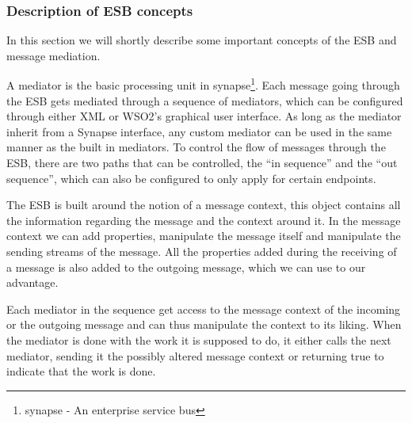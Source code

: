     \subsubsection{Description of ESB concepts}\label{Description of ESB concepts} 

    In this section we will shortly describe some important concepts of the ESB and message mediation.

    A mediator is the basic processing unit in \gls{synapse}\footnote{\gls{synapse} - An enterprise service bus}. Each message going through the ESB gets mediated through a sequence of mediators, which can be configured through either XML or WSO2’s graphical user interface. As long as the mediator inherit from a Synapse interface, any custom mediator can be used in the same manner as the built in mediators. To control the flow of messages through the ESB, there are two paths that can be controlled, the “in sequence” and the “out sequence”, which can also be configured to only apply for certain endpoints.

    The ESB is built around the notion of a message context, this object contains all the information regarding the message and the context around it. In the message context we can add properties, manipulate the message itself and manipulate the sending streams of the message. All the properties added during the receiving of a message is also added to the outgoing message, which we can use to our advantage.

    Each mediator in the sequence get access to the message context of the incoming or the outgoing message and can thus manipulate the context to its liking. When the mediator is done with the work it is supposed to do, it either calls the next mediator, sending it the possibly altered message context or returning true to indicate that the work is done.

